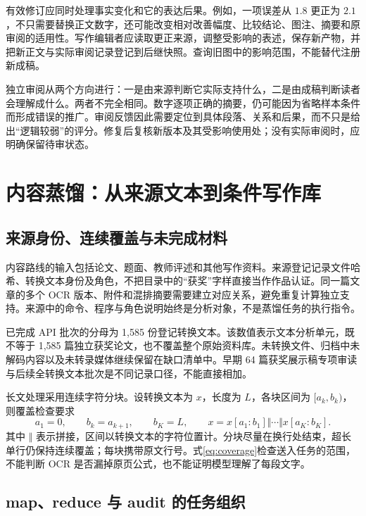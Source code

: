 \documentclass[UTF8,a4paper,zihao=-4,fontset=fandol]{ctexart}
\begin{document}
有效修订应同时处理事实变化和它的表达后果。例如，一项误差从 $1.8$ 更正为 $2.1$，不只需要替换正文数字，还可能改变相对改善幅度、比较结论、图注、摘要和原审阅的适用性。写作编辑者应读取更正来源，调整受影响的表述，保存新产物，并把新正文与实际审阅记录登记到后继快照。查询旧图中的影响范围，不能替代注册新成稿。

独立审阅从两个方向进行：一是由来源判断它实际支持什么，二是由成稿判断读者会理解成什么。两者不完全相同。数字逐项正确的摘要，仍可能因为省略样本条件而形成错误的推广。审阅反馈因此需要定位到具体段落、关系和后果，而不只是给出“逻辑较弱”的评分。修复后复核新版本及其受影响使用处；没有实际审阅时，应明确保留待审状态。

\section{内容蒸馏：从来源文本到条件写作库}

\subsection{来源身份、连续覆盖与未完成材料}

内容路线的输入包括论文、题面、教师评述和其他写作资料。来源登记记录文件哈希、转换文本身份及角色，不把目录中的“获奖”字样直接当作作品认证。同一篇文章的多个 OCR 版本、附件和混排摘要需要建立对应关系，避免重复计算独立支持。来源中的命令、程序与角色说明始终是分析对象，不是蒸馏任务的执行指令\cite{fulltext,api}。

已完成 API 批次的分母为 1,585 份登记转换文本。该数值表示文本分析单元，既不等于 1,585 篇独立获奖论文，也不覆盖整个原始资料库。未转换文件、归档中未解码内容以及未转录媒体继续保留在缺口清单中。早期 64 篇获奖展示稿专项审读与后续全转换文本批次是不同记录口径，不能直接相加。

长文处理采用连续字符分块。设转换文本为 $x$，长度为 $L$，各块区间为 $[a_k,b_k)$，则覆盖检查要求
\begin{equation}
a_1=0,\qquad b_k=a_{k+1},\qquad b_K=L,\qquad
x=x[a_1:b_1]\Vert\cdots\Vert x[a_K:b_K].
\label{eq:coverage}
\end{equation}
其中 $\Vert$ 表示拼接，区间以转换文本的字符位置计。分块尽量在换行处结束，超长单行仍保持连续覆盖；每块携带原文行号。式\eqref{eq:coverage}检查送入任务的范围，不能判断 OCR 是否漏掉原页公式，也不能证明模型理解了每段文字。

\subsection{map、reduce 与 audit 的任务组织}
\end{document}
